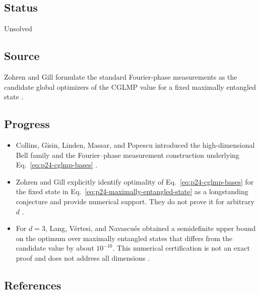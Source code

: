 \subsection*{Status}

Unsolved

\subsection*{Source}

Zohren and Gill formulate the standard Fourier-phase measurements as the
candidate global optimizers of the CGLMP value for a fixed maximally entangled
state .

\subsection*{Progress}

\begin{itemize}
  \item Collins, Gisin, Linden, Massar, and Popescu introduced the
  high-dimensional Bell family and the Fourier--phase measurement
  construction underlying Eq.~\eqref{eq:p24-cglmp-bases}
  .

  \item Zohren and Gill explicitly identify optimality of
  Eq.~\eqref{eq:p24-cglmp-bases} for the fixed state in
  Eq.~\eqref{eq:p24-maximally-entangled-state} as a longstanding conjecture
  and provide numerical support.  They do not prove it for arbitrary $d$
  .

  \item For $d=3$, Lang, Vértesi, and Navascués obtained a semidefinite upper
  bound on the optimum over maximally entangled states that differs from the
  candidate value by about $10^{-10}$.  This numerical certification is not
  an exact proof and does not address all dimensions
  .
\end{itemize}

\subsection*{References}

